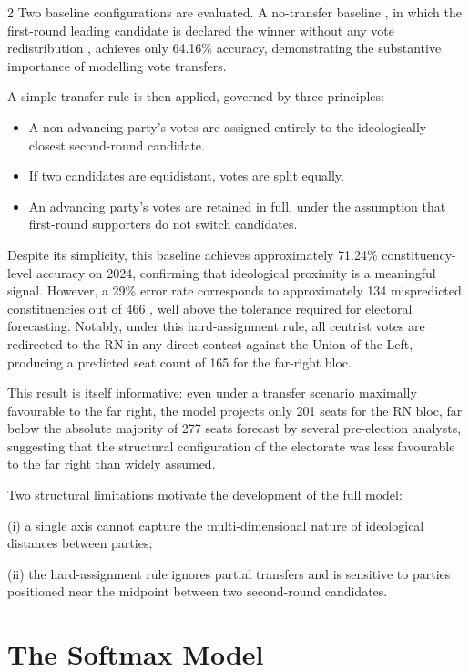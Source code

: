 \documentclass[10pt, a4paper]{article}
\begin{document}
\begin{multicols}{2}
Two baseline configurations are evaluated. A no-transfer baseline , in which
the first-round leading candidate is declared the winner without any vote
redistribution , achieves only 64.16\% accuracy, demonstrating the
substantive importance of modelling vote transfers.

A simple transfer rule is then applied, governed by three principles:

\begin{itemize}\setlength\itemsep{2pt}
  \item A non-advancing party's votes are assigned entirely to the
        ideologically closest second-round candidate.
  \item If two candidates are equidistant, votes are split equally.
  \item An advancing party's votes are retained in full, under the assumption
        that first-round supporters do not switch candidates.
\end{itemize}

Despite its simplicity, this baseline achieves approximately 71.24\%
constituency-level accuracy on 2024, confirming that ideological proximity
is a meaningful signal.
However, a 29\% error rate corresponds to approximately 134 mispredicted
constituencies out of 466 , well above the tolerance required for electoral
forecasting. Notably, under this hard-assignment rule, all centrist votes are
redirected to the RN in any direct contest against the Union of the Left,
producing a predicted seat count of 165 for the far-right bloc.

This result is itself informative: even under a transfer scenario maximally
favourable to the far right, the model projects only 201 seats for the RN
bloc, far below the absolute majority of 277 seats forecast by several
pre-election analysts, suggesting that the structural configuration of the
electorate was less favourable to the far right than widely assumed.

Two structural limitations motivate the development of the full model:

(i) a single axis cannot capture the multi-dimensional nature of ideological
distances between parties;

(ii) the hard-assignment rule ignores partial transfers and is sensitive to
parties positioned near the midpoint between two second-round candidates.

\section{The Softmax Model}
\label{sec:model}


\end{multicols}
\end{document}
